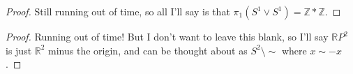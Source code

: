 \documentclass[12pt]{article}
\newenvironment{statement}[2][Statement]{\begin{trivlist}
\item[\hskip \labelsep {\bfseries #1}\hskip \labelsep {\bfseries #2.}]}{\end{trivlist}}
\begin{document}
\begin{statement}[Problem]{7}

\end{statement}
\begin{proof}
  Still running out of time, so all I'll say is that $\pi_1(S^1 \vee S^1) = \mathbb{Z} * \mathbb{Z}$.
\end{proof}

\begin{statement}[Problem]{8}

\end{statement}
\begin{proof}
  Running out of time! But I don't want to leave this blank, so I'll say $\mathbb{R}P^2$ is just $\mathbb{R}^2$ minus the origin, and 
  can be thought about as $S^2 \setminus \sim$ where $x \sim -x$.
\end{proof}
\end{document}

